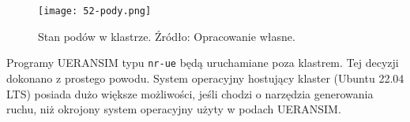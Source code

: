 \begin{figure}[!h]
    \centering \texttt{[image: 52-pody.png]}
    \caption{Stan podów w klastrze. Źródło: Opracowanie własne.}\label{fig:52-pody}
\end{figure}

Programy UERANSIM typu \texttt{nr-ue} będą uruchamiane poza klastrem. Tej decyzji dokonano z prostego powodu. System operacyjny hostujący klaster (Ubuntu 22.04 LTS) posiada dużo większe możliwości, jeśli chodzi o narzędzia generowania ruchu, niż okrojony system operacyjny użyty w podach UERANSIM.